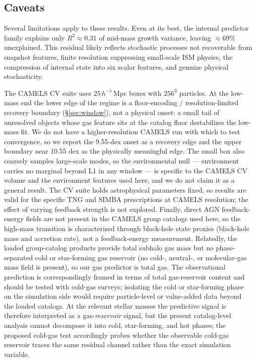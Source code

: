 \documentclass[twocolumn,linenumbers]{aastex701}
\begin{document}
\subsection{Caveats}
\label{sec:caveats}

Several limitations apply to these results.
Even at its best, the internal predictor family explains only
$R^2 \approx 0.31$ of mid-mass growth variance, leaving $\approx 69\%$
unexplained.
This residual likely reflects stochastic processes not recoverable from
snapshot features, finite resolution suppressing small-scale ISM physics,
the compression of internal state into six scalar features, and genuine
physical stochasticity.

The CAMELS CV suite uses $25\, h^{-1}\,\mathrm{Mpc}$ boxes with $256^3$
particles. At the low-mass end the lower edge of the regime is a
floor-encoding / resolution-limited recovery boundary (\S\ref{sec:window}), not
a physical onset: a small tail of unresolved objects whose gas feature sits at
the catalog floor destabilizes the low-mass fit. We do not have a
higher-resolution CAMELS run with which to test convergence, so we report the
9.55-dex onset as a recovery edge and the upper boundary near 10.55 dex as the
physically meaningful edge.
The small box also coarsely samples large-scale modes, so the environmental
null --- environment carries no marginal beyond L1 in any window --- is
specific to the CAMELS CV volume and the environment features used here, and we do
not claim it as a general result.
The CV suite holds astrophysical parameters fixed, so results are valid for the
specific TNG and SIMBA prescriptions at CAMELS resolution; the effect of varying
feedback strength is not explored.
Finally, direct AGN feedback-energy fields are not present in the CAMELS group
catalogs used here, so the high-mass transition is characterized through
black-hole state proxies (black-hole mass and accretion rate), not a
feedback-energy measurement.
Relatedly, the loaded group-catalog products provide total subhalo gas mass but
no phase-separated cold or star-forming gas reservoir (no cold-, neutral-, or
molecular-gas mass field is present), so our gas predictor is total gas. The
observational prediction is correspondingly framed in terms of total
gas-reservoir content and should be tested with cold-gas surveys; isolating the
cold or star-forming phase on the simulation side would require particle-level or
value-added data beyond the loaded catalogs. At the relevant stellar masses the
predictive signal is therefore interpreted as a gas-\emph{reservoir} signal, but the
present catalog-level analysis cannot decompose it into cold, star-forming, and hot
phases; the proposed cold-gas test accordingly probes whether the observable cold-gas
reservoir traces the same residual channel rather than the exact simulation variable.
\end{document}
